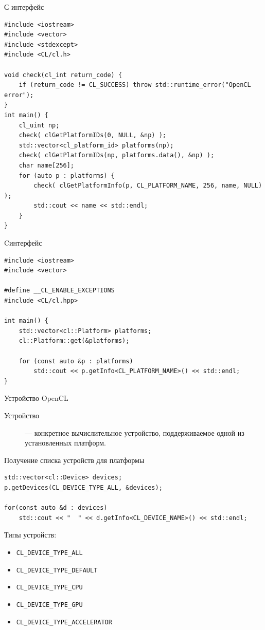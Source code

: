 \documentclass[@BEAMER_OPTIONS@]{beamer}
\newcommand{\code}[1]{\lstinline|#1|}
\newcommand{\CXX}{{\rm C}\plusplus}
\begin{document}
\begin{frame}[fragile]{С интерфейс}
    \begin{exampleblock}{}
        \begin{lstlisting}
#include <iostream>
#include <vector>
#include <stdexcept>
#include <CL/cl.h>

void check(cl_int return_code) {
    if (return_code != CL_SUCCESS) throw std::runtime_error("OpenCL error");
}
int main() {
    cl_uint np;
    check( clGetPlatformIDs(0, NULL, &np) );
    std::vector<cl_platform_id> platforms(np);
    check( clGetPlatformIDs(np, platforms.data(), &np) );
    char name[256];
    for (auto p : platforms) {
        check( clGetPlatformInfo(p, CL_PLATFORM_NAME, 256, name, NULL) );
        std::cout << name << std::endl;
    }
}
        \end{lstlisting}
    \end{exampleblock}
\end{frame}

\begin{frame}[fragile]{\CXX интерфейс}
    \begin{exampleblock}{}
        \begin{lstlisting}
#include <iostream>
#include <vector>

#define __CL_ENABLE_EXCEPTIONS
#include <CL/cl.hpp>

int main() {
    std::vector<cl::Platform> platforms;
    cl::Platform::get(&platforms);

    for (const auto &p : platforms)
        std::cout << p.getInfo<CL_PLATFORM_NAME>() << std::endl;
}
        \end{lstlisting}
    \end{exampleblock}
\end{frame}

\begin{frame}[fragile]{Устройство OpenCL}
    \begin{description}
        \item[Устройство] --- конкретное вычислительное устройство,
            поддерживаемое одной из установленных платформ.
    \end{description}
    \begin{exampleblock}{Получение списка устройств для платформы}
        \begin{lstlisting}
std::vector<cl::Device> devices;
p.getDevices(CL_DEVICE_TYPE_ALL, &devices);

for(const auto &d : devices)
    std::cout << "  " << d.getInfo<CL_DEVICE_NAME>() << std::endl;
        \end{lstlisting}
    \end{exampleblock}
    Типы устройств:
    \begin{itemize}
        \item \code{CL_DEVICE_TYPE_ALL}
        \item \code{CL_DEVICE_TYPE_DEFAULT}
        \item \code{CL_DEVICE_TYPE_CPU}
        \item \code{CL_DEVICE_TYPE_GPU}
        \item \code{CL_DEVICE_TYPE_ACCELERATOR}
    \end{itemize}
\end{frame}
\end{document}
